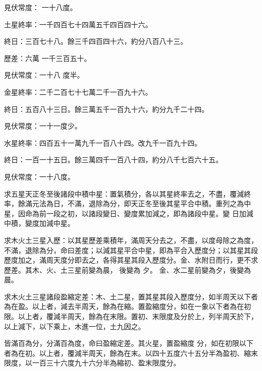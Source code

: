 \begin{pinyinscope}
 見伏常度：
 一十八度。



 土星終率：一千四百七十四萬五千四百四十六。



 終日：三百七十八。餘三千四百四十六，約分八百八十三。



 歷差：六萬
 一千三百五十。



 見伏常度：一十八
 度半。



 金星終率：二千二百七十七萬二千一百九十六。



 終日：五百八十三日。餘三萬五千一百九十六，約分九千二十四。



 見伏常度：一十一度少。



 水星終率：四百五十一萬九千一百八十四。改九千一百九十四。



 終日：一百一十五日。餘三萬四千一百八十四，約分八千七百六十五。



 見伏常度：一十八度。



 求五星天正冬至後諸段中積中星：置氣積分，各以其星終率去之，不盡，覆減終率，餘滿元法為日，不滿，退除為分，即天正冬至後其星平合中積。重列之為中星，因命為前一段之初，以諸段變日、變度累加減之，即為諸段中星。變
 日加減中積，變度加減中星。



 求木火土三星入歷：以其星歷差乘積年，滿周天分去之，不盡，以度母除之為度，不滿，退除為分，命曰差度；以減其星平合中星，即為平合入歷度分；以其星其段歷度加之，滿周天度分即去之，各得其星其段入歷度分。金、水附日而行，更不求歷差。其木、火、土三星前變為晨，
 後變為
 夕。
 金、水二星前變為夕，後變為晨。



 求木火土三星諸段盈縮定差：木、土二星，置其星其段入歷度分，如半周天以下者為在盈。以上者，減去半周天，餘為在縮。置盈縮度分，如在一象以下者為在初限。以上者，覆減半周天，餘為在末限。置初、末限度及分於上，列半周天於下，以上減下，以下乘上，木進一位，土九因之。



 皆滿百為分，分滿百為度，命曰盈縮定差。其火星，置盈縮度
 分，如在初限以下者為在初。以上者，覆減半周天，餘為在末。以四十五度六十五分半為盈初、縮末限度，以一百三十六度九十六分半為縮初、盈末限度分。




\end{pinyinscope}
